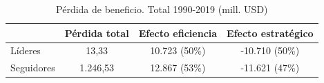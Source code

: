\footnotesize
\begin{table}[H]
\centering
\caption{Pérdida de beneficio. Total 1990-2019 (mill. USD)}
\label{tab:descomp_g}
\begin{tabular}{lccc}
\hline
            & \textbf{Pérdida total} & \textbf{Efecto eficiencia} & \textbf{Efecto estratégico}  \\ \hline
Líderes     & 13,33                    & 10.723 (50\%)             & -10.710 (50\%)                \\
Seguidores  & 1.246,53                 & 12.867 (53\%)             & -11.621 (47\%)                \\ \hline
\end{tabular}%

\end{table}